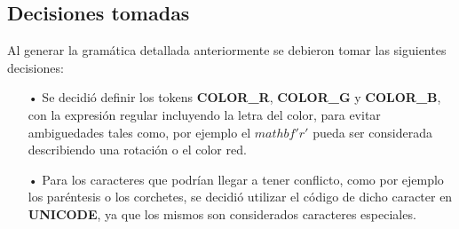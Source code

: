 \subsection{Decisiones tomadas}

Al generar la gram\'atica detallada anteriormente se debieron tomar las siguientes decisiones:

\begin{itemize}
\item[•] Se decidi\'o definir los tokens \textbf{COLOR\_R}, \textbf{COLOR\_G} y  \textbf{COLOR\_B}, con la expresión regular incluyendo la letra del color, para evitar ambiguedades tales como, por ejemplo el $mathbf{'r'}$ pueda ser considerada describiendo una rotación o el color red.

\item[•] Para los caracteres que podr\'ian llegar a tener conflicto, como por ejemplo los par\'entesis o los corchetes, se decidi\'o utilizar el c\'odigo de dicho caracter en \textbf{UNICODE}, ya que los mismos son considerados caracteres especiales.

\end{itemize}


